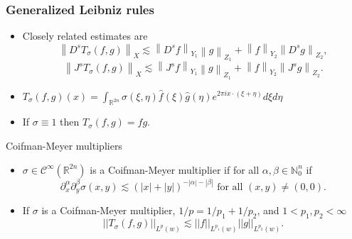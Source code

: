 \documentclass[xcolor=dvipsnames]{beamer}
\newcommand{\norm}[2]{{\left\| #1 \right\|}_{#2}}
\newcommand{\hcline}{1/p=1/p_1+1/p_2}
\begin{document}
\begin{frame}\frametitle{Generalized Leibniz rules}

\begin{itemize}
\item Closely related estimates are
\[ \norm{D^sT_\sigma(f,g)}{X} \lesssim \norm{D^sf}{Y_1}\norm{g}{Z_1}+\norm{f}{Y_2}\norm{D^sg}{Z_2}, \]
\[ \norm{J^sT_\sigma(f,g)}{X} \lesssim \norm{J^sf}{Y_1}\norm{g}{Z_1}+\norm{f}{Y_2}\norm{J^sg}{Z_2}. \]

\item $T_\sigma(f,g)(x) = \int_{\mathbb{R}^{2n}} \sigma(\xi,\eta) \widehat{f}(\xi)\widehat{g}(\eta) e^{2\pi i x\cdot (\xi + \eta)} d\xi d\eta$
\bigskip
\item If $\sigma \equiv 1$ then $T_\sigma(f,g) = fg.$
\end{itemize}

\end{frame}

\begin{frame}{Coifman-Meyer multipliers}
\begin{itemize}
\item $\sigma \in \mathcal{C}^\infty(\mathbb{R}^{2n})$ is a Coifman-Meyer multiplier if for all $\alpha,\beta \in \mathbb{N}^n_0$ if 
\[ \partial^\alpha_x \partial^\beta_y \sigma(x,y) \lesssim (|x| + |y|)^{-|\alpha| - |\beta|} \text{ for all } (x,y)\neq (0,0). \]

\bigskip

\item If $\sigma$ is a Coifman-Meyer multiplier, $\hcline$, and $1<p_1,p_2<\infty$ \[||T_\sigma(f,g)||_{L^p(w)} \lesssim ||f||_{L^{p_1}(w)} ||g||_{L^{p_2}(w)}.\]
\end{itemize}

\end{frame}
\end{document}
